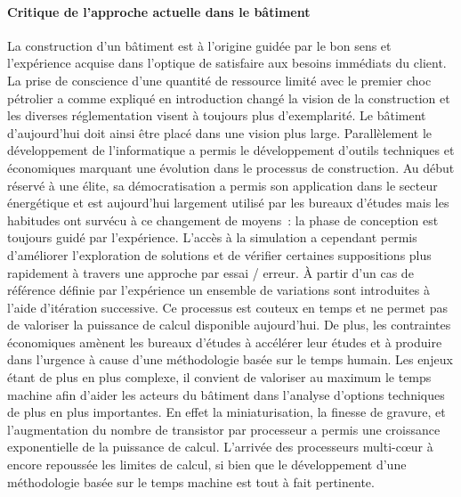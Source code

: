 \paragraph{Critique de l’approche actuelle dans le bâtiment} %
\label{par:critique_de_l_approche_actuelle_dans_le_batiment}
La construction d’un bâtiment est à l’origine guidée par le bon sens et l’expérience
acquise dans l’optique de satisfaire aux besoins immédiats du client. La prise
de conscience d’une quantité de ressource limité avec le premier choc pétrolier
a comme expliqué en introduction changé la vision de la construction et les diverses
réglementation visent à toujours plus d’exemplarité. Le bâtiment d’aujourd’hui doit
ainsi être placé dans une vision plus large.
Parallèlement le développement de l’informatique a permis le développement d’outils
techniques et économiques marquant une évolution dans le processus de construction.
Au début réservé à une élite, sa démocratisation a permis son application dans le secteur
énergétique et est aujourd’hui largement utilisé par les bureaux d’études mais
les habitudes ont survécu à ce changement de moyens~: la phase de conception est toujours
guidé par l’expérience. L’accès à la simulation a cependant permis d’améliorer
l’exploration de solutions et de vérifier certaines suppositions plus rapidement
à travers une approche par essai / erreur. À partir d’un cas de référence définie
par l’expérience un ensemble de variations sont introduites à l’aide d’itération
successive. Ce processus est couteux en temps et ne permet pas de valoriser la puissance
de calcul disponible aujourd’hui. De plus, les contraintes économiques amènent les bureaux
d’études à accélérer leur études et à produire dans l’urgence à cause d’une méthodologie
basée sur le temps humain.
Les enjeux étant de plus en plus complexe, il convient de valoriser au maximum le
temps machine afin d’aider les acteurs du bâtiment dans l’analyse d’options techniques
de plus en plus importantes.
En effet la miniaturisation, la finesse de gravure,
et l’augmentation du nombre de transistor par processeur a permis une croissance
exponentielle de la puissance de calcul. L’arrivée des processeurs multi-cœur à encore
repoussée les limites de calcul, si bien que le développement d’une méthodologie basée
sur le temps machine est tout à fait pertinente.

